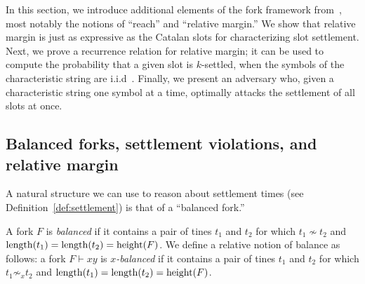 In this section, we introduce additional elements of the fork framework from~\citet{LinearConsistency}, 
most notably the notions of ``reach'' and ``relative margin.'' 
We show that relative margin is just as expressive 
as the Catalan slots 
for characterizing slot settlement. 
Next, we prove a recurrence relation for relative margin; 
it can be used to compute 
the probability that a given slot is $k$-settled, 
when the symbols of the characteristic string are i.i.d\ .
Finally, we present an adversary who, 
given a characteristic string one symbol at a time, 
optimally attacks the settlement of all slots at once. 









\subsection{Balanced forks, settlement violations, and relative margin}

A natural structure we can use to reason about settlement times 
(see Definition~\ref{def:settlement}) 
is that of a ``balanced fork.''

\begin{definition}\label{def:balanced-fork} A
  fork $F$ is \emph{balanced} if it contains a pair of tines $t_1$ and
  $t_2$ for which $t_1\nsim t_2$ and
  $\operatorname{length}(t_1)=\operatorname{length}(t_2)=\operatorname{height}(F)$. We define a relative notion
  of balance as follows: a fork $F \vdash xy$ is \emph{$x$-balanced}
  if it contains a pair of tines $t_1$ and $t_2$ for which
  $t_1 \not\sim_x t_2$ and $\operatorname{length}(t_1) = \operatorname{length}(t_2) = \operatorname{height}(F)$.
\end{definition}

